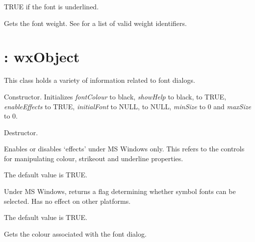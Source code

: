 

TRUE if the font is underlined.



Gets the font weight. See  for a list of valid
weight identifiers.

\section{: wxObject}\label{wxfontdata}


This class holds a variety of information related to font dialogs.



Constructor. Initializes {\it fontColour} to black, {\it showHelp} to black,
 to TRUE, {\it enableEffects} to TRUE, {\it initialFont} to NULL,
 to NULL, {\it minSize} to 0 and {\it maxSize} to 0.



Destructor.



Enables or disables `effects' under MS Windows only. This refers to the
controls for manipulating colour, strikeout and underline properties.

The default value is TRUE.



Under MS Windows, returns a flag determining whether symbol fonts can be selected. Has no
effect on other platforms.

The default value is TRUE.



Gets the colour associated with the font dialog.

